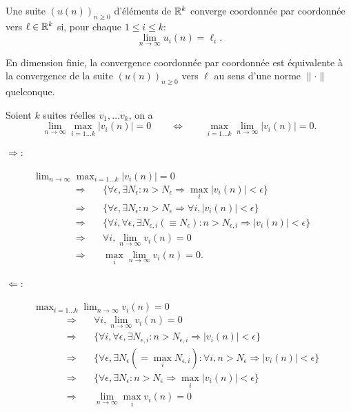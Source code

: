 \begin{definition}
  Une suite $(u(n))_{n \geq 0}$ d'éléments de $\mathbb{R}^k$ converge coordonnée par coordonnée vers $\ell \in \mathbb{R}^k$ si, pour chaque $1 \leq i \leq k$:
  $$
  \lim_{n \to \infty} u_i(n) = \ell_i.
  $$
\end{definition}

\begin{proposition} \label{prop:convergenceParCoordonnee}
  En dimension finie, la convergence coordonnée par coordonnée est équivalente à la convergence de la suite $(u(n))_{n \geq 0}$ vers $\ell$ au sens d'une norme $\|\cdot\|$ quelconque.
\end{proposition}

\begin{lemma} \label{lem:interversionLimiteMaximum}
  Soient $k$ suites réelles $v_1, \dots v_k$, on a
  $$
  \lim_{n \to \infty} \max_{i=1 \dots k} |v_i(n)| = 0
  \qquad \Leftrightarrow \qquad
  \max_{i=1 \dots k} \lim_{n \to \infty} |v_i(n)| = 0.
  $$
\end{lemma}

\begin{description}
  \item[$\Rightarrow$:] $\lim_{n \to \infty} \max_{i=1 \dots k} |v_i(n)| = 0$
  \begin{align*}
    \Rightarrow \quad & \{\forall \epsilon, \exists N_\epsilon: n > N_\epsilon \Rightarrow \max_i |v_i(n)| < \epsilon\} \\
    \Rightarrow \quad & \{\forall \epsilon, \exists N_\epsilon: n > N_\epsilon \Rightarrow \forall i, |v_i(n)| < \epsilon\} \\
    \Rightarrow \quad & \{\forall i, \forall \epsilon, \exists N_{\epsilon, i}(\equiv N_\epsilon): n > N_{\epsilon, i} \Rightarrow |v_i(n)| < \epsilon\} \\
    \Rightarrow \quad & \forall i, \lim_{n \to \infty} v_i(n) = 0 \\
    \Rightarrow \quad & \max_i \lim_{n \to \infty} v_i(n) = 0.
  \end{align*}
  \item[$\Leftarrow$:] $\max_{i=1 \dots k} \lim_{n \to \infty} v_i(n) = 0$
  \begin{align*}
    \Rightarrow \quad & \forall i, \lim_{n \to \infty} v_i(n) = 0 \\
    \Rightarrow \quad & \{\forall i, \forall \epsilon, \exists N_{\epsilon, i}: n > N_{\epsilon, i} \Rightarrow |v_i(n)| < \epsilon\}\\
    \Rightarrow \quad & \{\forall \epsilon, \exists N_\epsilon (= \max_i N_{\epsilon, i}): \forall i, n > N_\epsilon \Rightarrow |v_i(n)| < \epsilon\}\\
    \Rightarrow \quad & \{\forall \epsilon, \exists N_\epsilon: n > N_\epsilon \Rightarrow \max_i |v_i(n)| < \epsilon\}\\
    \Rightarrow \quad & \lim_{n \to \infty} \max_i v_i(n) = 0
  \end{align*}
\end{description}
\eproof

